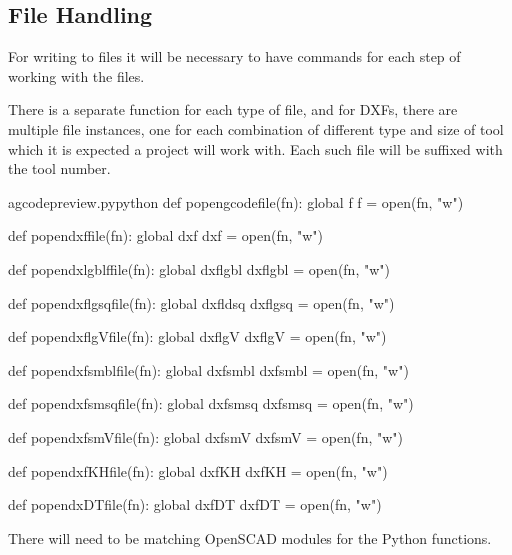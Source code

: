 \documentclass{ltxdoc}
\begin{document}
\subsection{File Handling}
 
For writing to files it will be necessary to have commands for each step of working with the files. 
 
There is a separate function for each type of file, and for DXFs, there are multiple file
instances, one for each combination of different type and size of tool which it is expected 
a project will work with. Each such file will be suffixed with the tool number.

\lstset{firstnumber=\thegcpy}
\begin{writecode}{a}{gcodepreview.py}{python}
def popengcodefile(fn):
    global f
    f = open(fn, "w")

def popendxffile(fn):
    global dxf
    dxf = open(fn, "w")

def popendxlgblffile(fn):
    global dxflgbl
    dxflgbl = open(fn, "w")

def popendxflgsqfile(fn):
    global dxfldsq
    dxflgsq = open(fn, "w")

def popendxflgVfile(fn):
    global dxflgV
    dxflgV = open(fn, "w")

def popendxfsmblfile(fn):
    global dxfsmbl
    dxfsmbl = open(fn, "w")

def popendxfsmsqfile(fn):
    global dxfsmsq
    dxfsmsq = open(fn, "w")

def popendxfsmVfile(fn):
    global dxfsmV
    dxfsmV = open(fn, "w")

def popendxfKHfile(fn):
    global dxfKH
    dxfKH = open(fn, "w")

def popendxDTfile(fn):
    global dxfDT
    dxfDT = open(fn, "w")

\end{writecode}
\addtocounter{gcpy}{40}

There will need to be matching OpenSCAD modules for the Python functions.
\end{document}
